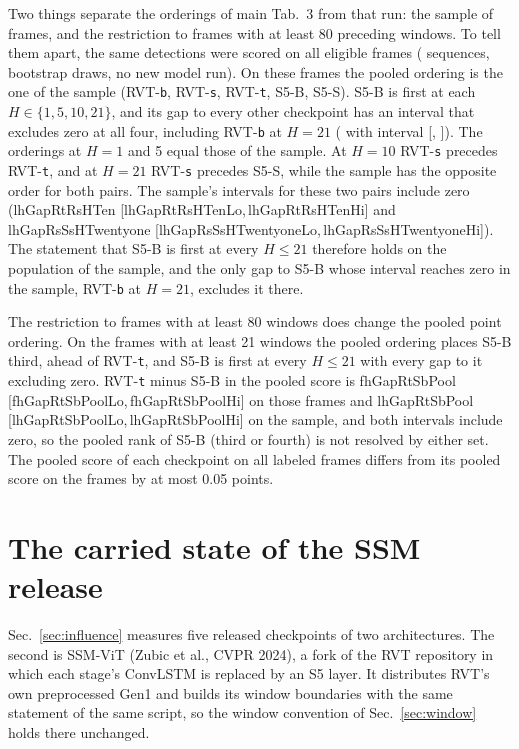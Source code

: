 \documentclass[10pt,twocolumn,letterpaper]{article}
\newcommand{\fhgap}[3]{\csname fhGap#1#2#3\endcsname{} [\csname fhGap#1#2#3Lo\endcsname,\,\csname fhGap#1#2#3Hi\endcsname]}
\newcommand{\lhgap}[3]{\csname lhGap#1#2#3\endcsname{} [\csname lhGap#1#2#3Lo\endcsname,\,\csname lhGap#1#2#3Hi\endcsname]}
\begin{document}
Two things separate the orderings of main Tab.~3 from that run: the sample of \lhNFrames{} frames, and the restriction to frames with at least 80 preceding windows. To tell them apart, the same detections were scored on all \lhNElig{} eligible frames (\lqNSeq{} sequences, \lhB{} bootstrap draws, no new model run). On these frames the pooled ordering is the one of the sample (RVT-\texttt{b}, RVT-\texttt{s}, RVT-\texttt{t}, S5-B, S5-S). S5-B is first at each $H\in\{1,5,10,21\}$, and its gap to every other checkpoint has an interval that excludes zero at all four, including RVT-\texttt{b} at $H=21$ (\lqGapRbSbHTwentyone{} with interval [\lqGapRbSbHTwentyoneLo{}, \lqGapRbSbHTwentyoneHi{}]). The orderings at $H=1$ and 5 equal those of the sample. At $H=10$ RVT-\texttt{s} precedes RVT-\texttt{t}, and at $H=21$ RVT-\texttt{s} precedes S5-S, while the sample has the opposite order for both pairs. The sample's intervals for these two pairs include zero (\lhgap{Rt}{Rs}{HTen} and \lhgap{Rs}{Ss}{HTwentyone}). The statement that S5-B is first at every $H\le21$ therefore holds on the population of the sample, and the only gap to S5-B whose interval reaches zero in the sample, RVT-\texttt{b} at $H=21$, excludes it there.

The restriction to frames with at least 80 windows does change the pooled point ordering. On the \fhNCommon{} frames with at least 21 windows the pooled ordering places S5-B third, ahead of RVT-\texttt{t}, and S5-B is first at every $H\le21$ with every gap to it excluding zero. RVT-\texttt{t} minus S5-B in the pooled score is \fhgap{Rt}{Sb}{Pool} on those frames and \lhgap{Rt}{Sb}{Pool} on the sample, and both intervals include zero, so the pooled rank of S5-B (third or fourth) is not resolved by either set. The pooled score of each checkpoint on all \fhNAll{} labeled frames differs from its pooled score on the \fhNCommon{} frames by at most 0.05 points.

\section{The carried state of the SSM release}
\label{sup:state}


Sec.~\ref{sec:influence} measures five released checkpoints of two architectures. The second is
SSM-ViT (Zubic et al., CVPR 2024), a fork of the RVT repository in which each stage's
ConvLSTM is
replaced by an S5 layer. It distributes RVT's own preprocessed Gen1 and builds its window
boundaries with the same statement of the same script, so the window convention of
Sec.~\ref{sec:window} holds there unchanged.
\end{document}
